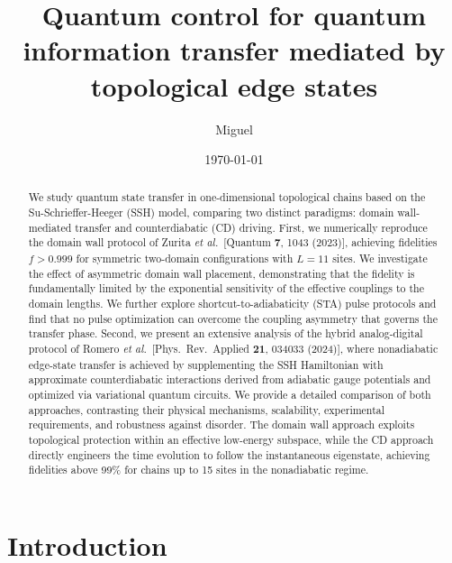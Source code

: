 \documentclass[
  reprint,
  amsmath,
  amssymb,
  aps,
  prb,
  longbibliography,
]{revtex4-2}
\begin{document}
\title{Quantum control for quantum information transfer mediated by topological edge states}

\author{Miguel}

\date{\today}

\begin{abstract}
We study quantum state transfer in one-dimensional topological chains based on the
Su-Schrieffer-Heeger (SSH) model, comparing two distinct paradigms:
domain wall-mediated transfer and counterdiabatic (CD) driving.
First, we numerically reproduce the domain wall protocol of
Zurita \textit{et al.}~[Quantum \textbf{7}, 1043 (2023)],
achieving fidelities $f > 0.999$ for symmetric two-domain configurations with
$L = 11$ sites. We investigate the effect of asymmetric domain wall placement,
demonstrating that the fidelity is fundamentally limited by the exponential
sensitivity of the effective couplings to the domain lengths.
We further explore shortcut-to-adiabaticity (STA) pulse protocols and find that
no pulse optimization can overcome the coupling asymmetry that governs the
transfer phase.
Second, we present an extensive analysis of the hybrid analog-digital protocol
of Romero \textit{et al.}~[Phys.\ Rev.\ Applied \textbf{21}, 034033 (2024)],
where nonadiabatic edge-state transfer is achieved by supplementing the SSH
Hamiltonian with approximate counterdiabatic interactions derived from adiabatic
gauge potentials and optimized via variational quantum circuits.
We provide a detailed comparison of both approaches, contrasting their physical
mechanisms, scalability, experimental requirements, and robustness against
disorder. The domain wall approach exploits topological protection within an
effective low-energy subspace, while the CD approach directly engineers the
time evolution to follow the instantaneous eigenstate, achieving fidelities
above 99\% for chains up to 15 sites in the nonadiabatic regime.
\end{abstract}

\maketitle

\section{Introduction}
\label{sec:intro}
\end{document}

